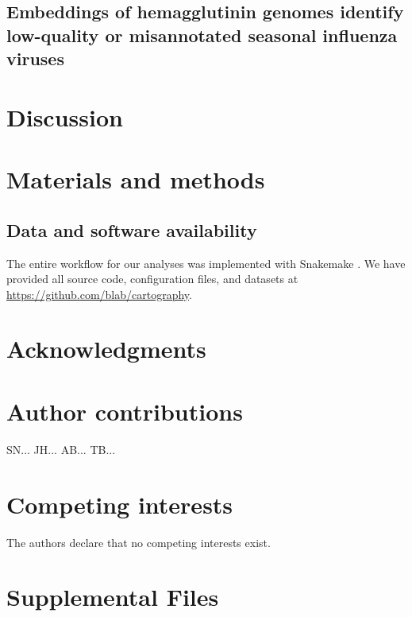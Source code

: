 \documentclass[9pt,lineno]{elife}
\begin{document}
\subsection*{Embeddings of hemagglutinin genomes identify low-quality or misannotated seasonal influenza viruses}

\section*{Discussion}

\section*{Materials and methods}

\subsection*{Data and software availability}

The entire workflow for our analyses was implemented with Snakemake \citep{molder_2021}.
We have provided all source code, configuration files, and datasets at \href{https://github.com/blab/cartography}{https://github.com/blab/cartography}.

\section*{Acknowledgments}

\section*{Author contributions}

SN...
JH...
AB...
TB...

\section*{Competing interests}

The authors declare that no competing interests exist.

\section*{Supplemental Files}


\end{document}
